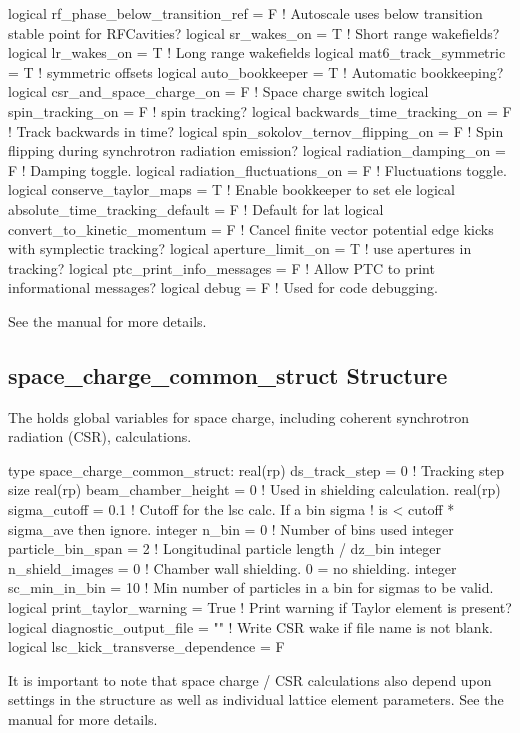 {{{{{{{{\begin{example}
    logical rf_phase_below_transition_ref = F   ! Autoscale uses below transition stable point for RFCavities?
    logical sr_wakes_on = T                     ! Short range wakefields?
    logical lr_wakes_on = T                     ! Long range wakefields
    logical mat6_track_symmetric = T            ! symmetric offsets
    logical auto_bookkeeper = T                 ! Automatic bookkeeping?
    logical csr_and_space_charge_on = F         ! Space charge switch
    logical spin_tracking_on = F                ! spin tracking?
    logical backwards_time_tracking_on = F      ! Track backwards in time?
    logical spin_sokolov_ternov_flipping_on = F ! Spin flipping during synchrotron radiation emission?
    logical radiation_damping_on = F            ! Damping toggle.
    logical radiation_fluctuations_on = F       ! Fluctuations toggle.
    logical conserve_taylor_maps = T            ! Enable bookkeeper to set ele%
    logical absolute_time_tracking_default = F  ! Default for lat%
    logical convert_to_kinetic_momentum = F     ! Cancel finite vector potential edge kicks with symplectic tracking?
    logical aperture_limit_on = T               ! use apertures in tracking?
    logical ptc_print_info_messages = F         ! Allow PTC to print informational messages?
    logical debug = F                           ! Used for code debugging.
\end{example}
See the \bmad manual for more details.

\subsection{space\_charge\_common\_struct Structure}
\label{s:csr.param.struct} 

The  holds global variables for space charge, including coherent
synchrotron radiation (CSR), calculations. 
\begin{example}
  type space_charge_common_struct:
    real(rp) ds_track_step = 0          ! Tracking step size
    real(rp) beam_chamber_height = 0    ! Used in shielding calculation.
    real(rp) sigma_cutoff = 0.1         ! Cutoff for the lsc calc. If a bin sigma
                                        !  is < cutoff * sigma_ave then ignore.
    integer n_bin = 0                   ! Number of bins used
    integer particle_bin_span = 2       ! Longitudinal particle length / dz_bin
    integer n_shield_images = 0         ! Chamber wall shielding. 0 = no shielding.
    integer sc_min_in_bin = 10          ! Min number of particles in a bin for sigmas to be valid.
    logical print_taylor_warning = True ! Print warning if Taylor element is present?
    logical diagnostic_output_file = "" ! Write CSR wake if file name is not blank.
    logical lsc_kick_transverse_dependence = F
\end{example}
It is important to note that space charge / CSR calculations also depend upon settings in the
 structure as well as individual lattice element parameters.  See the \bmad
manual for more details.

}}}}}}}}
